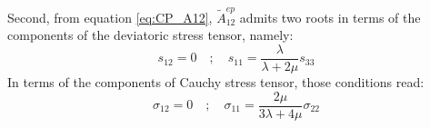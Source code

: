 Second, from equation \eqref{eq:CP_A12}, $\widetilde{A}_{12}^{ep}$ admits two roots in terms of the components of the deviatoric stress tensor, namely: 
\begin{equation}
  s_{12}=0 \quad ; \quad s_{11}= \frac{\lambda}{\lambda+2\mu}s_{33}
\end{equation}
In terms of the components of Cauchy stress tensor, those conditions read:
\begin{equation}
  \label{eq:CP_roots}
  \sigma_{12}=0 \quad ; \quad \sigma_{11}=\frac{2\mu}{3\lambda+4\mu}\sigma_{22}
\end{equation}




